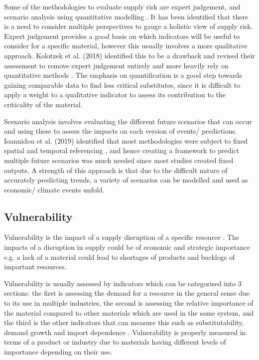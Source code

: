 \documentclass{article}
\begin{document}
Some of the methodologies to evaluate supply risk are expert judgement, and scenario analysis using quantitative modelling \cite{schrijvers2020review}. It has been identified that there is a need to consider multiple perspectives to gauge a holistic view of supply risk. Expert judgement provides a good basis on which indicators will be useful to consider for a specific material, however this usually involves a more qualitative approach. Kolotzek et al. (2018) identified this to be a drawback and revised their assessment to remove expert judgement entirely and more heavily rely on quantitative methods \cite{KOLOTZEK2018566}. The emphasis on quantification is a good step towards gaining comparable data to find less critical substitutes, since it is difficult to apply a weight to a qualitative indicator to assess its contribution to the criticality of the material. 

Scenario analysis involves evaluating the different future scenarios that can occur and using these to assess the impacts on each version of events/ predictions. Ioannidou et al. (2019) identified that most methodologies were subject to fixed spatial and temporal referencing \cite{ioannidou2019future}, and hence creating a framework to predict multiple future scenarios was much needed since most studies created fixed outputs. A strength of this approach is that due to the difficult nature of accurately predicting trends, a variety of scenarios can be modelled and used as economic/ climate events unfold. 

\subsection{Vulnerability}

Vulnerability is the impact of a supply disruption of a specific resource \cite{schrijvers2020review, gloser2015raw, helbig2021selecting}. The impacts of a disruption in supply could be of economic and strategic importance e.g. a lack of a material could lead to shortages of products and backlogs of important resources.

Vulnerability is usually assessed by indicators which can be categorised into 3 sections: the first is assessing the demand for a resource in the general sense due to its use in multiple industries, the second is assessing the relative importance of the material compared to other materials which are used in the same system, and the third is the other indicators that can measure this such as substitutability, demand growth and import dependence \cite{schrijvers2020review}. Vulnerability is properly measured in terms of a product or industry due to materials having different levels of importance depending on their use.
    
\end{document}
